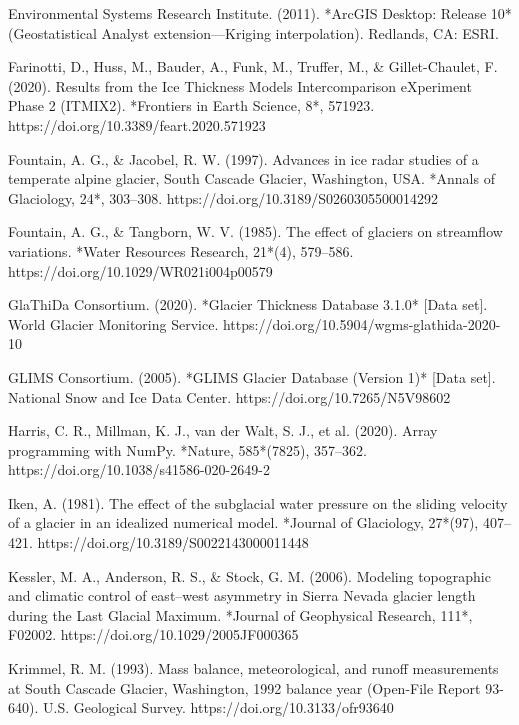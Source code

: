 \documentclass{article}
\begin{document}
\begin{thebibliography}{}
    Environmental Systems Research Institute. (2011). *ArcGIS Desktop: Release 10* (Geostatistical Analyst extension—Kriging interpolation). Redlands, CA: ESRI.

    Farinotti, D., Huss, M., Bauder, A., Funk, M., Truffer, M., \& Gillet-Chaulet, F. (2020). Results from the Ice Thickness Models Intercomparison eXperiment Phase 2 (ITMIX2). *Frontiers in Earth Science, 8*, 571923. https://doi.org/10.3389/feart.2020.571923

    Fountain, A. G., \& Jacobel, R. W. (1997). Advances in ice radar studies of a temperate alpine glacier, South Cascade Glacier, Washington, USA. *Annals of Glaciology, 24*, 303–308. https://doi.org/10.3189/S0260305500014292

    Fountain, A. G., \& Tangborn, W. V. (1985). The effect of glaciers on streamflow variations. *Water Resources Research, 21*(4), 579–586. https://doi.org/10.1029/WR021i004p00579

    GlaThiDa Consortium. (2020). *Glacier Thickness Database 3.1.0* [Data set]. World Glacier Monitoring Service. https://doi.org/10.5904/wgms-glathida-2020-10

    GLIMS Consortium. (2005). *GLIMS Glacier Database (Version 1)* [Data set]. National Snow and Ice Data Center. https://doi.org/10.7265/N5V98602

    Harris, C. R., Millman, K. J., van der Walt, S. J., et al. (2020). Array programming with NumPy. *Nature, 585*(7825), 357–362. https://doi.org/10.1038/s41586-020-2649-2

    Iken, A. (1981). The effect of the subglacial water pressure on the sliding velocity of a glacier in an idealized numerical model. *Journal of Glaciology, 27*(97), 407–421. https://doi.org/10.3189/S0022143000011448

    Kessler, M. A., Anderson, R. S., \& Stock, G. M. (2006). Modeling topographic and climatic control of east–west asymmetry in Sierra Nevada glacier length during the Last Glacial Maximum. *Journal of Geophysical Research, 111*, F02002. https://doi.org/10.1029/2005JF000365

    Krimmel, R. M. (1993). Mass balance, meteorological, and runoff measurements at South Cascade Glacier, Washington, 1992 balance year (Open-File Report 93-640). U.S. Geological Survey. https://doi.org/10.3133/ofr93640


\end{thebibliography}
\end{document}
